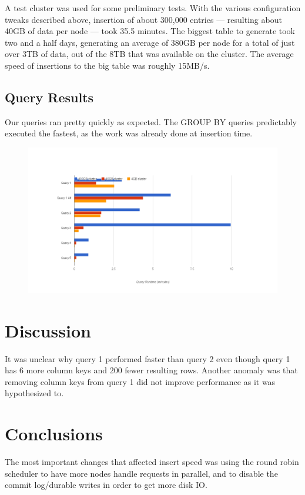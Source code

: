 \documentclass[letterpaper]{article}
\begin{document}
A test cluster was used for some preliminary tests. With the
various configuration tweaks described above, insertion of about 300,000
entries --- resulting about 40GB of data per node --- took 35.5 minutes.
The biggest table to generate took two and a half days, generating an average
of 380GB per node for a total of just over 3TB of data, out of the 8TB that was
available on the cluster. The average speed of insertions to the big table was
roughly 15MB/s. 

\subsection{Query Results}

Our queries ran pretty quickly as expected. The GROUP BY queries predictably executed the
fastest, as the work was already done at insertion time.
\begin{figure}[h]
	\centering
	\includegraphics[resolution=300]{chart}
	\label{fig:Query Execution Times}
\end{figure}

\section{Discussion}

It was unclear why query 1 performed faster than query 2 even though query 1
has 6 more column keys and 200 fewer resulting rows. Another anomaly was that
removing column keys from query 1 did not improve performance as it was
hypothesized to.

\section{Conclusions}

The most important changes that affected insert speed was using the round
robin scheduler to have more nodes handle requests in parallel, and to disable
the commit log/durable writes in order to get more disk IO.
\end{document}
